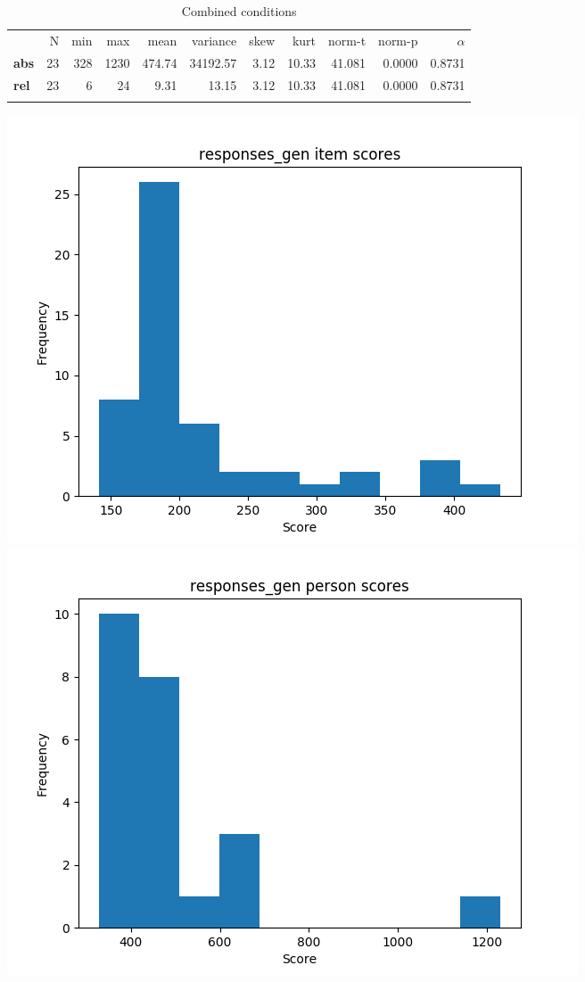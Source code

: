 \begin{longtable}[c]{@{}lrrrrrrrrrr@{}}
\caption{Combined conditions}
\endfirsthead
\toprule\addlinespace
& N & min & max & mean & variance & skew & kurt & norm-t &
norm-p & $\alpha$
\\\addlinespace
\midrule
\textbf{abs} & 23 & 328 & 1230 & 474.74 & 34192.57 & 3.12 & 10.33 &
41.081 & 0.0000 & 0.8731
\\\addlinespace
\textbf{rel} & 23 & 6 & 24 & 9.31 & 13.15 & 3.12 & 10.33 & 41.081 &
0.0000 & 0.8731
\\\addlinespace
\bottomrule
\end{longtable}

\includegraphics{img/responses_gen_diff.png}
\includegraphics{img/responses_gen_abil.png}

